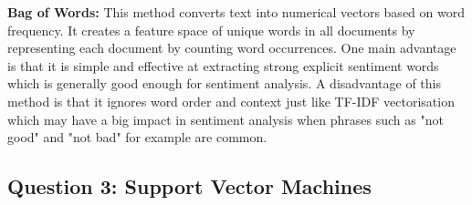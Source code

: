 \begin{enumerate}[label=\textbf{(\alph*)}, leftmargin=*, align=left]
          \textbf{Bag of Words:} This method converts text into numerical vectors based on word frequency. It creates a feature space of unique words in all documents by representing each document
          by counting word occurrences. One main advantage is that it is simple and effective at extracting strong explicit sentiment words which is generally good enough for sentiment
          analysis. A disadvantage of this method is that it ignores word order and context just like TF-IDF vectorisation which may have a big impact in sentiment analysis when phrases such
          as "not good" and "not bad" for example are common.
    
\end{enumerate}

\subsection{Question 3: Support Vector Machines}

